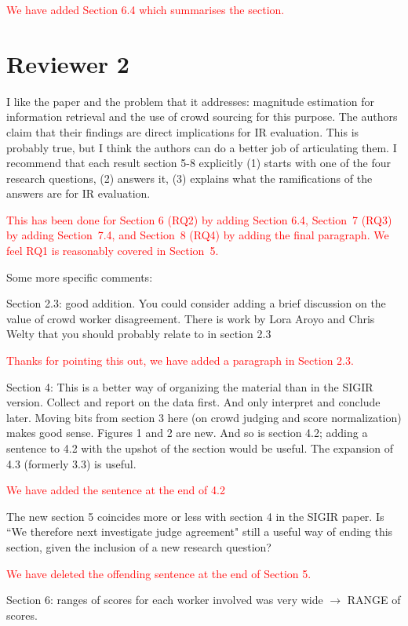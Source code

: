 \documentclass[a4paper]{article}
\newcommand{\comment}[1]{\vspace{1em} \textcolor{red}{{#1}} \vspace{1em}}
\begin{document}
\comment{We have added Section 6.4 which summarises the section.}



\section{Reviewer 2}

I like the paper and the problem that it addresses: magnitude
estimation for information retrieval and the use of crowd sourcing
for this purpose. The authors claim that their findings are direct
implications for IR evaluation. This is probably true, but I think
the authors can do a better job of articulating them. I recommend
that each result section 5-8 explicitly (1) starts with one of the
four research questions, (2) answers it, (3) explains what the
ramifications of the answers are for IR evaluation.

\comment{
This has been done for Section 6 (RQ2) by adding Section 6.4, 
Section~7 (RQ3) by adding Section~7.4, and
Section~8 (RQ4) by adding the final paragraph.
We feel RQ1 is reasonably covered in Section~5.
}

Some more specific comments:

Section 2.3: good addition. You could consider adding a brief
discussion on the value of crowd worker disagreement. There is work
by Lora Aroyo and Chris Welty that you should probably relate to
in section 2.3

\comment {Thanks for pointing this out, we have added a paragraph in Section 2.3.}

Section 4: This is a better way of organizing the material than in
the SIGIR version. Collect and report on the data first. And only
interpret and conclude later. Moving bits from section 3 here (on
crowd judging and score normalization) makes good sense. Figures 1
and 2 are new. And so is section 4.2; adding a sentence to 4.2 with
the upshot of the section would be useful. The expansion of 4.3
(formerly 3.3) is useful.

\comment {We have added the sentence at the end of 4.2}

The new section 5 coincides more  or less with section 4 in the
SIGIR paper. Is ``We therefore next investigate judge agreement"
still a useful  way of ending this section, given the inclusion of
a new research question?

\comment {We have deleted the offending sentence at the end of Section 5.}

Section 6:  ranges of scores for each worker involved was very wide
$\rightarrow$ RANGE of scores. 
\end{document}
